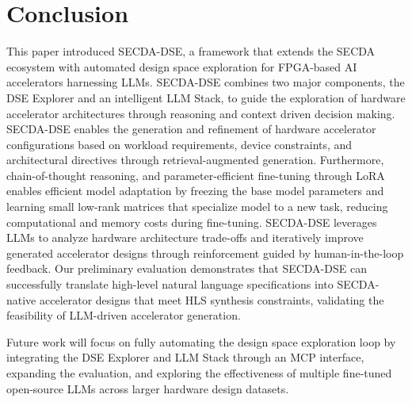 
\section{Conclusion}
\label{conclude}

This paper introduced SECDA-DSE, a framework that extends the SECDA ecosystem with automated design space exploration for FPGA-based AI accelerators harnessing LLMs. 
SECDA-DSE combines two major components, the DSE Explorer and an intelligent LLM Stack, to guide the exploration of hardware accelerator architectures through reasoning and context driven decision making. 
SECDA-DSE enables the generation and refinement of hardware accelerator configurations based on workload requirements, device constraints, and architectural directives through retrieval-augmented generation. Furthermore, chain-of-thought reasoning, and parameter-efficient fine-tuning through LoRA enables efficient model adaptation by freezing the base model parameters and learning small low-rank matrices that specialize model to a new task, reducing computational and memory costs during fine-tuning. 
SECDA-DSE leverages LLMs to analyze hardware architecture trade-offs and iteratively improve generated accelerator designs through reinforcement guided by human-in-the-loop feedback. 
Our preliminary evaluation demonstrates that SECDA-DSE can successfully translate high-level natural language specifications into SECDA-native accelerator designs that meet HLS synthesis constraints, validating the feasibility of LLM-driven accelerator generation.

Future work will focus on fully automating the design space exploration loop by integrating the DSE Explorer and LLM Stack through an MCP interface, expanding the evaluation, and exploring the effectiveness of multiple fine-tuned open-source LLMs across larger hardware design datasets.